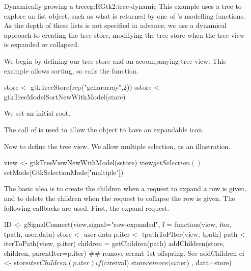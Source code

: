 \begin{example}{Dynamically growing a tree}{eg:RGtk2:tree-dynamic}
This example uses a tree to explore an \R\/ list object, such as what
is returned by one of \R's modelling functions.  As the depth of these
lists is not specified in advance, we use a dynamical approach to
creating the tree store, modifying the tree store when the tree view
is expanded or collapsed.
  

We begin by defining our tree store and an acoompanying tree
view. This example allows sorting, so calls the
 function.
\begin{Schunk}
\begin{Sinput}
 store <- gtkTreeStore(rep("gchararray",2))
 sstore <- gtkTreeModelSortNewWithModel(store)
\end{Sinput}
\end{Schunk}

We set an initial root.
\begin{Schunk}
\end{Schunk}
The call of  is used to allow the object
to have an expandable icon. 


Now to define the tree view. We allow multiple selection, as an illustration.
\begin{Schunk}
\begin{Sinput}
 view <- gtkTreeViewNewWithModel(sstore)
 view$getSelection()$setMode(GtkSelectionMode["multiple"])
\end{Sinput}
\end{Schunk}


The basic idea is to create the children when a request to expand a
row is given, and to delete the children when the request to collapse
the row is given. The following callbacks are used. First, the expand request.


\begin{Schunk}
\begin{Sinput}
 ID <- gSignalConnect(view,signal="row-expanded",
           f = function(view, iter, tpath, user.data) {
             store <- user.data
             p.iter <- tpathToPIter(view, tpath)
             path <- iterToPath(view, p.iter)
             children = getChildren(path)
             addChildren(store, children, parentIter=p.iter)
             ## remove errant 1st offspring. See addChildren
             ci <- store$iterChildren(p.iter)
             if(ci$retval) store$remove(ci$iter)
           },
           data=store)
\end{Sinput}
\end{Schunk}


\end{example}
